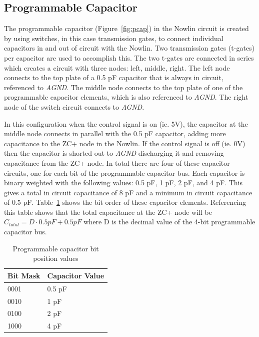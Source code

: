 \documentclass[12pt,oneside,final]{siuethesis}
\theoremstyle{definition}
\begin{document}
\subsection{Programmable Capacitor}
\par The programmable capacitor (Figure~\ref{fig:pcap}) in the Nowlin circuit is created by using switches, in this case transmission gates, to connect individual capacitors in and out of circuit with the Nowlin. Two transmission gates (t-gates) per capacitor are used to accomplish this. The two t-gates are connected in series which creates a circuit with three nodes: left, middle, right. The left node connects to the top plate of a 0.5 pF capacitor that is always in circuit, referenced to \emph{AGND}. The middle node connects to the top plate of one of the programmable capacitor elements, which is also referenced to \emph{AGND}. The right node of the switch circuit connects to \emph{AGND}.
\par In this configuration when the control signal is on (ie. 5V), the capacitor at the middle node connects in parallel with the 0.5 pF capacitor, adding more capacitance to the ZC+ node in the Nowlin. If the control signal is off (ie. 0V) then the capacitor is shorted out to \emph{AGND} discharging it and removing capacitance from the ZC+ node. In total there are four of these capacitor circuits, one for each bit of the programmable capacitor bus. Each capacitor is binary weighted with the following values: 0.5 pF, 1 pF, 2 pF, and 4 pF. This gives a total in circuit capacitance of 8 pF and a minimum in circuit capacitance of 0.5 pF. Table~\ref{tab:pcap} shows the bit order of these capacitor elements. Referencing this table shows that the total capacitance at the ZC+ node will be $C_{total} = D \cdot 0.5pF + 0.5pF$ where D is the decimal value of the 4-bit programmable capacitor bus.
\begin{table}[ht]
\centering
	\begin{tabular}{|l|p{4cm}|}
		\hline
		Bit Mask & Capacitor Value\\\hline
		0001 & 0.5 pF\\\hline
		0010 & 1 pF\\\hline
		0100 & 2 pF\\\hline
		1000 & 4 pF\\\hline
	\end{tabular}
    \caption{Programmable capacitor bit position values}
 	\label{tab:pcap}
\end{table}
\end{document}
